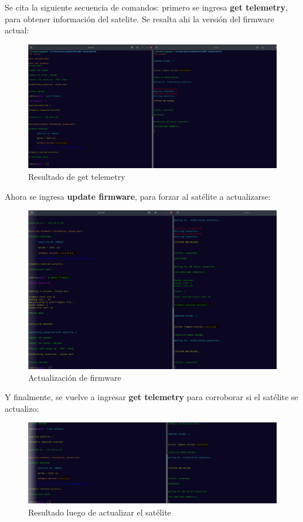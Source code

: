 \documentclass[fontsize=12pt]{article}
\begin{document}
Se cita la siguiente secuencia de comandos: primero se ingresa \textbf{get telemetry}, para obtener información del satelite. Se resalta ahi la versión del firmware actual:\\
\begin{figure}[H]
\centering
\includegraphics[scale =0.36]{get_tel.jpg}
\caption{Resultado de get telemetry}
\end{figure}

\clearpage
Ahora se ingresa \textbf{update firmware}, para forzar al satélite a actualizarse:\\

\begin{figure}[H]
\centering
\includegraphics[scale =0.42]{new_firmw.jpg}
\caption{Actualización de firmware}
\end{figure}

Y finalmente, se vuelve a ingresar \textbf{get telemetry} para corroborar si el satélite se actualizo: \\

\begin{figure}[H]
\centering
\includegraphics[scale =0.37]{get_new_firmw.jpg}
\caption{Resultado luego de actualizar el satélite}
\end{figure}
\end{document}
